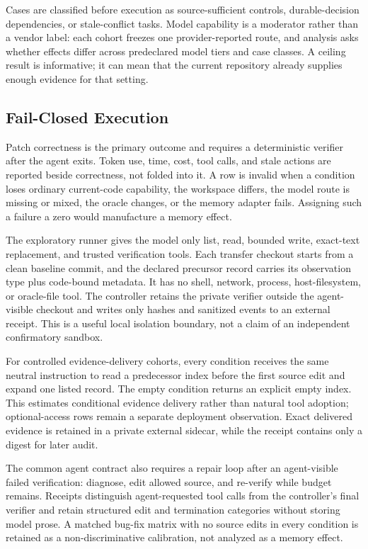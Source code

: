 \documentclass[10pt,conference]{IEEEtran}
\begin{document}
Cases are classified before execution as source-sufficient controls,
durable-decision dependencies, or stale-conflict tasks. Model capability is a
moderator rather than a vendor label: each cohort freezes one provider-reported
route, and analysis asks whether effects differ across predeclared model tiers
and case classes. A ceiling result is informative; it can mean that the current
repository already supplies enough evidence for that setting.

\subsection{Fail-Closed Execution}

Patch correctness is the primary outcome and requires a deterministic verifier
after the agent exits. Token use, time, cost, tool calls, and stale actions are
reported beside correctness, not folded into it. A row is invalid when a
condition loses ordinary current-code capability, the workspace differs, the
model route is missing or mixed, the oracle changes, or the memory adapter
fails. Assigning such a failure a zero would manufacture a memory effect.

The exploratory runner gives the model only list, read, bounded write,
exact-text replacement, and trusted verification tools. Each transfer checkout
starts from a clean baseline commit, and the declared precursor record carries
its observation type plus code-bound metadata. It has no shell, network,
process, host-filesystem, or oracle-file tool. The controller retains the
private verifier outside the agent-visible checkout and writes only hashes and
sanitized events to an external receipt. This is a useful local isolation
boundary, not a claim of an independent confirmatory sandbox.

For controlled evidence-delivery cohorts, every condition receives the same
neutral instruction to read a predecessor index before the first source edit and
expand one listed record. The empty condition returns an explicit empty index.
This estimates conditional evidence delivery rather than natural tool adoption;
optional-access rows remain a separate deployment observation. Exact delivered
evidence is retained in a private external sidecar, while the receipt contains
only a digest for later audit.

The common agent contract also requires a repair loop after an agent-visible
failed verification: diagnose, edit allowed source, and re-verify while budget
remains. Receipts distinguish agent-requested tool calls from the controller's
final verifier and retain structured edit and termination categories without
storing model prose. A matched bug-fix matrix with no source edits in every
condition is retained as a non-discriminative calibration, not analyzed as a
memory effect.
\end{document}
